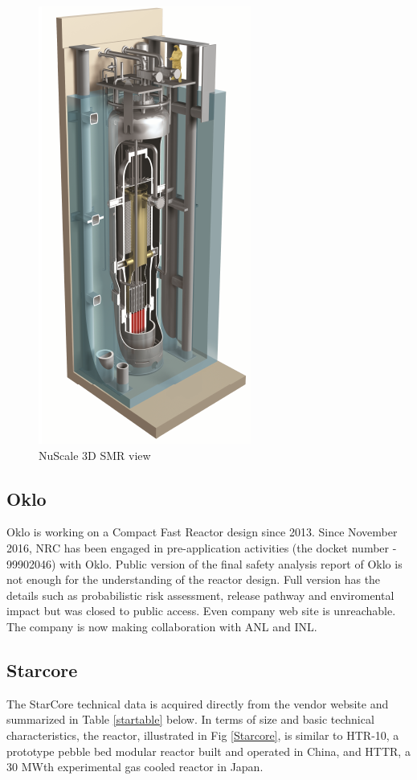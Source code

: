 \documentclass[10pt,a4paper]{article}
\begin{document}
\begin{figure}[htbp]
\centering
\includegraphics[scale=0.8]{Figs/nuscale3d.jpeg}
\caption{NuScale 3D SMR view}
\label{Nu3d}
\end{figure}

\subsection{Oklo}
Oklo is working on a Compact Fast Reactor design since 2013. Since November 2016, NRC has been engaged in pre-application activities (the docket number - 99902046) with Oklo. Public version of the final safety analysis report of Oklo \cite{Oklofsar} is not enough for the understanding of the reactor design. Full version has the details such as probabilistic risk assessment, release pathway and enviromental impact but was closed to public access. Even company web site is unreachable. The company is now making collaboration with ANL and INL. 

\subsection{Starcore}
The StarCore technical data is acquired directly from the vendor website and summarized in Table \ref{startable} below. In terms of size and basic technical characteristics, the reactor, illustrated in Fig \ref{Starcore}, is similar to HTR-10, a prototype pebble bed modular reactor built and operated in China, and HTTR, a 30 MWth experimental gas cooled reactor in Japan.
\end{document}
